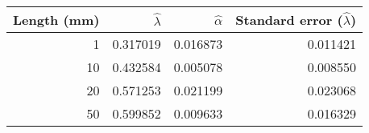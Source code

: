 \begin{tabular}{rrrr}
\toprule
 Length (mm) &  $\hat{\lambda}$ &  $\hat{\alpha}$ &  Standard error ($\hat{\lambda}$) \\
\midrule
           1 &         0.317019 &        0.016873 &                          0.011421 \\
          10 &         0.432584 &        0.005078 &                          0.008550 \\
          20 &         0.571253 &        0.021199 &                          0.023068 \\
          50 &         0.599852 &        0.009633 &                          0.016329 \\
\bottomrule
\end{tabular}
